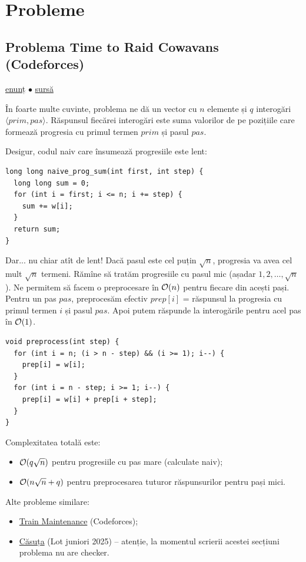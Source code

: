 \documentclass[../main.tex]{subfiles}
\begin{document}
\section{Probleme}

\subsection{Problema Time to Raid Cowavans (Codeforces)}
\label{problem:time-to-raid-cowavans}

\href{https://codeforces.com/contest/103/problem/D}{enunț}
$\bullet$
\hyperref[code:time-to-raid-cowavans]{sursă}

În foarte multe cuvinte, problema ne dă un vector cu $n$ elemente și $q$ interogări $\langle prim, pas \rangle$. Răspunsul fiecărei interogări este suma valorilor de pe pozițiile care formează progresia cu primul termen $prim$ și pasul $pas$.

Desigur, codul naiv care însumează progresiile este lent:

\begin{verbatim}
long long naive_prog_sum(int first, int step) {
  long long sum = 0;
  for (int i = first; i <= n; i += step) {
    sum += w[i];
  }
  return sum;
}
\end{verbatim}

Dar... nu chiar atît de lent! Dacă pasul este cel puțin $\sqrt{n}$, progresia va avea cel mult $\sqrt{n}$ termeni. Rămîne să tratăm progresiile cu pasul mic (așadar $1, 2, \dots, \sqrt{n}$). Ne permitem să facem o preprocesare în $\mathcal{O}(n)$ pentru fiecare din acești pași. Pentru un pas $pas$, preprocesăm efectiv $prep[i]$ = răspunsul la progresia cu primul  termen $i$ și pasul $pas$.  Apoi putem răspunde la interogările pentru acel pas în $\mathcal{O}(1)$.

\begin{verbatim}
void preprocess(int step) {
  for (int i = n; (i > n - step) && (i >= 1); i--) {
    prep[i] = w[i];
  }
  for (int i = n - step; i >= 1; i--) {
    prep[i] = w[i] + prep[i + step];
  }
}
\end{verbatim}

Complexitatea totală este:


\begin{itemize}
  \item $\mathcal{O}(q \sqrt{n})$ pentru progresiile cu pas mare (calculate naiv);
  \item $\mathcal{O}(n \sqrt{n} + q)$ pentru preprocesarea tuturor răspunsurilor pentru pași mici.
\end{itemize}

Alte probleme similare:

\begin{itemize}
  \item \href{https://codeforces.com/contest/1580/problem/C}{Train Maintenance} (Codeforces);
  \item \href{https://kilonova.ro/problems/3939}{Căsuța} (Lot juniori 2025) -- atenție, la momentul scrierii acestei secțiuni problema nu are checker.
\end{itemize}
\end{document}
